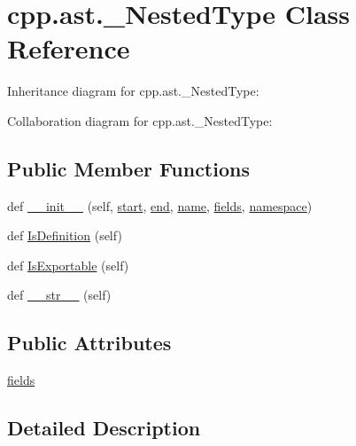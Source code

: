 \hypertarget{classcpp_1_1ast_1_1___nested_type}{}\section{cpp.\+ast.\+\_\+\+Nested\+Type Class Reference}
\label{classcpp_1_1ast_1_1___nested_type}


Inheritance diagram for cpp.\+ast.\+\_\+\+Nested\+Type\+:


Collaboration diagram for cpp.\+ast.\+\_\+\+Nested\+Type\+:
\subsection*{Public Member Functions}
\begin{DoxyCompactItemize}
\item 
def \hyperlink{classcpp_1_1ast_1_1___nested_type_a63acff60f38885be6cc11231fffc3f4e}{\+\_\+\+\_\+init\+\_\+\+\_\+} (self, \hyperlink{classcpp_1_1ast_1_1_node_a7b2aa97e6a049bb1a93aea48c48f1f44}{start}, \hyperlink{classcpp_1_1ast_1_1_node_a3c5e5246ccf619df28eca02e29d69647}{end}, \hyperlink{classcpp_1_1ast_1_1___generic_declaration_af774f4729dfd78d0538a6782fe8514c1}{name}, \hyperlink{classcpp_1_1ast_1_1___nested_type_aed69c37a409b4d26e6cfde2de3185d86}{fields}, \hyperlink{classcpp_1_1ast_1_1___generic_declaration_a8aee3f11b37449d54b42a78e0a689f46}{namespace})
\item 
def \hyperlink{classcpp_1_1ast_1_1___nested_type_a9f160999863f39c9032f60b014e213d5}{Is\+Definition} (self)
\item 
def \hyperlink{classcpp_1_1ast_1_1___nested_type_a689f8b0dc20e6070938825eee483dd2f}{Is\+Exportable} (self)
\item 
def \hyperlink{classcpp_1_1ast_1_1___nested_type_a18901ec6acba88c526d703444bf4d52c}{\+\_\+\+\_\+str\+\_\+\+\_\+} (self)
\end{DoxyCompactItemize}
\subsection*{Public Attributes}
\begin{DoxyCompactItemize}
\item 
\hyperlink{classcpp_1_1ast_1_1___nested_type_aed69c37a409b4d26e6cfde2de3185d86}{fields}
\end{DoxyCompactItemize}


\subsection{Detailed Description}


